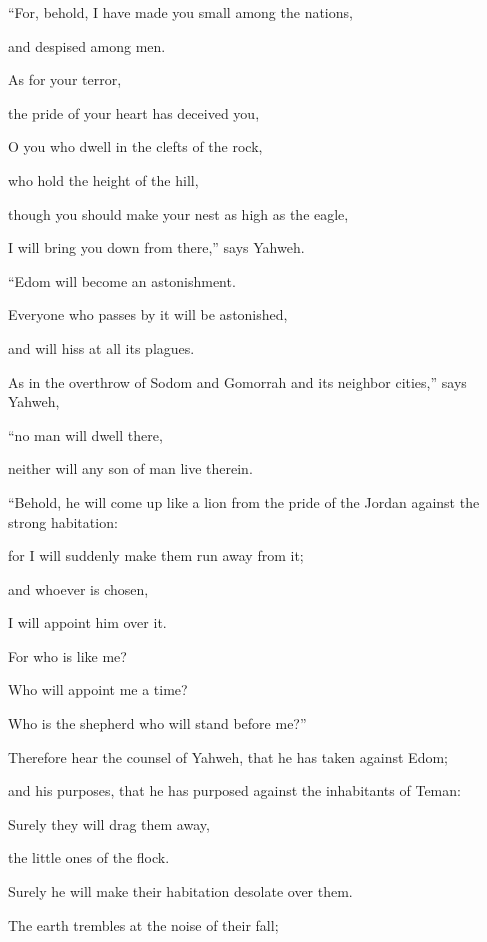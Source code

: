 {\par }{\BB \par }{\Q {}“For, behold, I have made you small among the nations,
\par }{\QB and despised among men.
\par }{\Q {}As for your terror,
\par }{\QB the pride of your heart has deceived you,
\par }{\Q O you who dwell in the clefts of the rock,
\par }{\QB who hold the height of the hill,
\par }{\Q though you should make your nest as high as the eagle,
\par }{\QB I will bring you down from there,” says Yahweh.
\par }{\Q {}“Edom will become an astonishment.
\par }{\QB Everyone who passes by it will be astonished,
\par }{\QB and will hiss at all its plagues.
\par }{\Q {}As in the overthrow of Sodom and Gomorrah and its neighbor cities,” says Yahweh,
\par }{\QB “no man will dwell there,
\par }{\QB neither will any son of man live therein.
\par }{\BB \par }{\Q {}“Behold, he will come up like a lion from the pride of the Jordan against the strong habitation:
\par }{\QB for I will suddenly make them run away from it;
\par }{\Q and whoever is chosen,
\par }{\QB I will appoint him over it.
\par }{\Q For who is like me?
\par }{\QB Who will appoint me a time?
\par }{\QB Who is the shepherd who will stand before me?”
\par }{\Q {}Therefore hear the counsel of Yahweh, that he has taken against Edom;
\par }{\QB and his purposes, that he has purposed against the inhabitants of Teman:
\par }{\Q Surely they will drag them away,
\par }{\QB the little ones of the flock.
\par }{\QB Surely he will make their habitation desolate over them.
\par }{\Q {}The earth trembles at the noise of their fall;
}
